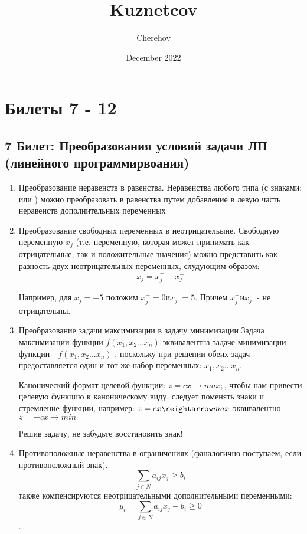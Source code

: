 \documentclass[14pt, letterpaper]{article}
\title{Kuznetcov}
\author{Cherehov}
\date{December 2022}
\begin{document}
\maketitle

\section{Билеты 7 - 12}

\newpage
\subsection{7 Билет: Преобразования условий задачи ЛП (линейного программирвоания)}


\begin{enumerate}
    \item 
    
    Преобразование неравенств в равенства.
    Неравенства любого типа (с знаками: \leq или \geq) можно преобразовать в равенства путем добавление в левую часть неравенств дополнительных переменных 
    
    \item  Преобразование свободных переменных в неотрицательыне.
    Свободную переменную $x_{j}$ (т.е. переменную, которая может принимать как отрицательные, так и положительные значения) можно представить как разность двух неотрицательных переменных, слудующим образом:
    $$ x_{j} = x^{+}_{j} - x^{-}_{j}$$

    Например, для $x_{j} = -5$ положим $ x^{+}_{j} = 0 и x^{-}_{j} = 5$. Причем $x^{+}_{j} и x^{-}_{j}$ - не отрицательны.

    \item Преобразование задачи максимизации в задачу минимизации
    Задача максимизации функции $f(x_{1}, x_{2} ... x_{n})$  эквивалентна задаче минимизации функции - $f(x_{1}, x_{2} ... x_{n})$ , поскольку при решении обеих задач предоставляется один и тот же набор переменных: $x_{1}, x_{2} ... x_{n}$.

    Канонический формат целевой функции: $z = cx \rightarrow max;$, чтобы нам привести целевую функцию к каноническому виду, следует поменять знаки и стремление функции, например: 
    $z = cx \reightarrow max$ эквивалентно $z = -cx \rightarrow min$

    Решив задачу, не забудьте восстановить знак!
    
    \item Противоположные неравенства в ограничениях  (фаналогично поступаем, если противоположный знак).
    $$\sum\limits_{j \in N} a_{ij}x_{j} \geq b_{i}$$
    также компенсируются неотрицательными дополнительными переменными:
    $$y_{i} = \sum\limits_{j \in N} a_{ij}x_{j} - b_{i} \geq 0 $$.
\end{enumerate}
\end{document}
